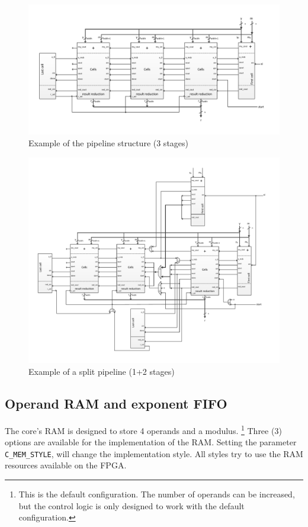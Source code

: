\newpage 
\begin{figure}[H]
\centering
\includegraphics[trim=1.2cm 1.2cm 1.2cm 1.2cm, width=25cm, angle=90]{pictures/sys_pipeline_notsplit.pdf}
\caption{Example of the pipeline structure (3 stages)}
\label{pipeline_structure}
\end{figure}
\newpage

\newpage 
\begin{figure}[H]
\centering
\includegraphics[trim=1.2cm 1.2cm 1.2cm 1.2cm, width=22cm, angle=90]{pictures/sys_pipeline.pdf}
\caption{Example of a split pipeline (1+2 stages)}
\label{pipeline_structure_split}
\end{figure}
\newpage


\subsection{Operand RAM and exponent FIFO} \label{subsec:RAM_and_FIFO}
The core's RAM is designed to store 4 operands and a modulus. \footnote{This is the default configuration. The number of operands can be increased, but the control logic is only designed to work with the default configuration.} Three (3) options are available for the implementation of the RAM. Setting the parameter \verb|C_MEM_STYLE|, will change the implementation style. All styles try to use the RAM resources available on the FPGA.

